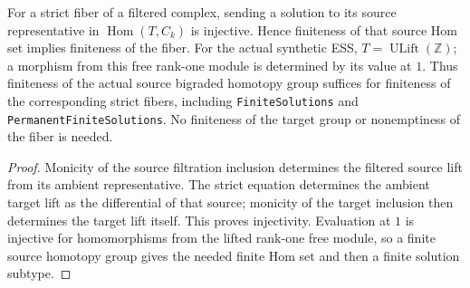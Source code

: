 \begin{lemma}
  \label{lem:strict-fiber-finite-of-source}
  \leanok
  For a strict fiber of a filtered complex, sending a solution to its
  source representative in $\operatorname{Hom}(T,C_k)$ is injective.
  Hence finiteness of that source Hom set implies finiteness of the fiber.
  For the actual synthetic ESS, $T=\operatorname{ULift}(\mathbb Z)$;
  a morphism from this free rank-one module is determined by its value at
  $1$.  Thus finiteness of the actual source bigraded homotopy group
  suffices for finiteness of the corresponding strict fibers, including
  \texttt{FiniteSolutions} and \texttt{PermanentFiniteSolutions}.
  No finiteness of the target group or nonemptiness of the fiber is needed.
\end{lemma}
\begin{proof}
  \leanok
  Monicity of the source filtration inclusion determines the filtered
  source lift from its ambient representative.  The strict equation
  determines the ambient target lift as the differential of that source;
  monicity of the target inclusion then determines the target lift itself.
  This proves injectivity.  Evaluation at $1$ is injective for homomorphisms
  from the lifted rank-one free module, so a finite source homotopy group
  gives the needed finite Hom set and then a finite solution subtype.
\end{proof}

